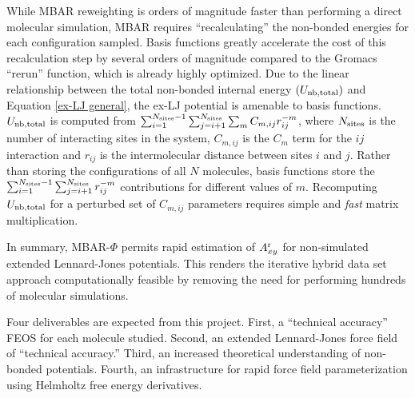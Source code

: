 \documentclass[11pt,a4paper]{article}
\begin{document}
While MBAR reweighting is orders of magnitude faster than performing a direct molecular simulation, MBAR requires ``recalculating'' the non-bonded energies for each configuration sampled. Basis functions greatly accelerate the cost of this recalculation step by several orders of magnitude compared to the Gromacs ``rerun'' function, which is already highly optimized. Due to the linear relationship between the total non-bonded internal energy $(U_{\rm nb, total})$ and Equation \ref{ex-LJ general}, the ex-LJ potential is amenable to basis functions. $U_{\rm nb, total}$ is computed from $\sum_{i=1}^{N_{\rm sites}-1} \sum_{j=i+1}^{N_{\rm sites}} \sum_m C_{m,ij} r_{ij}^{-m}$, where $N_{\rm sites}$ is the number of interacting sites in the system, $C_{m,ij}$ is the $C_{m}$ term for the $ij$ interaction and $r_{ij}$ is the intermolecular distance between sites $i$ and $j$. Rather than storing the configurations of all $N$ molecules, basis functions store the $\sum_{i=1}^{N_{\rm sites}-1} \sum_{j=i+1}^{N_{\rm sites}} r_{ij}^{-m}$ contributions for different values of $m$. Recomputing $U_{\rm nb, total}$ for a perturbed set of $C_{m,ij}$ parameters requires simple and \textit{fast} matrix multiplication.

In summary, MBAR-$\Phi$ permits rapid estimation of $A_{xy}^{\rm r}$ for non-simulated extended Lennard-Jones potentials. This renders the iterative hybrid data set approach computationally feasible by removing the need for performing hundreds of molecular simulations.

Four deliverables are expected from this project. First, a ``technical accuracy'' FEOS for each molecule studied. Second, an extended Lennard-Jones force field of ``technical accuracy.'' Third, an increased theoretical understanding of non-bonded potentials. Fourth, an infrastructure for rapid force field parameterization using Helmholtz free energy derivatives. 


\end{document}
